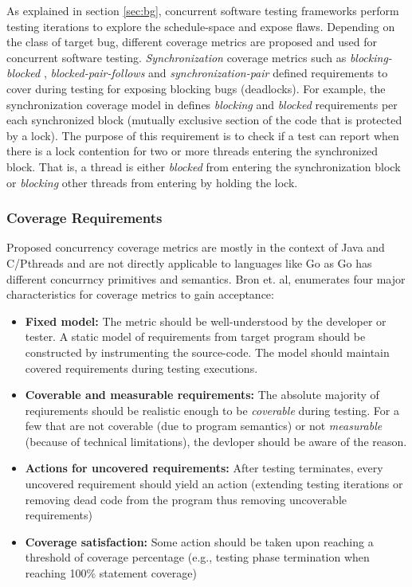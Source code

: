 As explained in section \ref{sec:bg}, concurrent software testing frameworks perform testing iterations to explore the schedule-space and expose flaws.
%
Depending on the class of target bug, different coverage metrics are proposed and used for concurrent software testing.
%
\textit{Synchronization} coverage metrics such as \textit{blocking-blocked} \cite{edelstein2003contest}, \textit{blocked-pair-follows} \cite{trainin-followsCoverage-padtad09} and \textit{synchronization-pair} \cite{hong-syncTesting-issta12} defined requirements to cover during testing for exposing blocking bugs (\eg deadlocks).
%
%
For example, the synchronization coverage model in \cite{edelstein2003contest} defines \textit{blocking} and \textit{blocked} requirements per each synchronized block (\ie mutually exclusive section of the code that is protected by a lock).
%
The purpose of this requirement is to check if a test can report when there is a lock contention for two or more threads entering the synchronized block.
%
That is, a thread is either \textit{blocked} from entering the synchronization block or \textit{blocking} other threads from entering by holding the lock.
%

\subsubsection{Coverage Requirements}
\label{sec:coverage_requirements}
Proposed concurrency coverage metrics are mostly in the context of Java and C/Pthreads and are not directly applicable to languages like Go as Go has different concurrncy primitives and semantics.
%
Bron et. al,\cite{bron-appSyncCov-ppopp05} enumerates four major characteristics for coverage metrics to gain acceptance:
\begin{itemize}
  \item \textbf{Fixed model:} The metric should be well-understood by the developer or tester. A static model of requirements from target program should be constructed by instrumenting the source-code. The model should maintain covered requirements during testing executions.
  \item \textbf{Coverable and measurable requirements:} The absolute majority of reqiurements should be realistic enough to be \textit{coverable} during testing. For a few that are not coverable (due to program semantics) or not \textit{measurable} (because of technical limitations), the devloper should be aware of the reason.
  \item \textbf{Actions for uncovered requirements:} After testing terminates, every uncovered requirement should yield an action (\eg extending testing iterations or removing dead code from the program thus removing uncoverable requirements)
  \item \textbf{Coverage satisfaction:} Some action should be taken upon reaching a threshold of coverage percentage (e.g., testing phase termination when reaching 100\% statement coverage)
\end{itemize}

